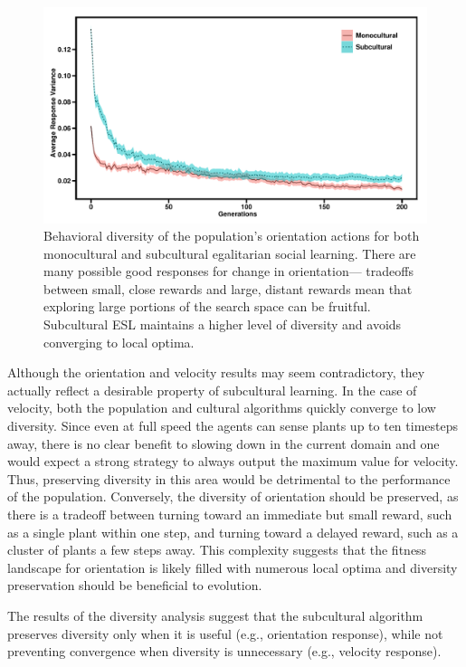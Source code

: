 \documentclass{sig-alternate}
\begin{document}
\begin{figure}
  \centering
    \includegraphics[scale=.42]{orientation_diversity.pdf}
  \caption{Behavioral diversity of the population's orientation actions for both monocultural and subcultural egalitarian social learning.   There are many possible good responses for change in orientation--- tradeoffs between small, close rewards and large, distant rewards mean that exploring large portions of the search space can be fruitful.  Subcultural ESL maintains a higher level of diversity and avoids converging to local optima.}
\label{fig:orientation}
\end{figure}

Although the orientation and velocity results may seem contradictory, they actually reflect a desirable property of subcultural learning. In the case of velocity, both the population and cultural algorithms quickly converge to low diversity. Since even at full speed the agents can sense plants up to ten timesteps away, there is no clear benefit to slowing down in the current domain and one would expect a strong strategy to always output the maximum value for velocity. Thus, preserving diversity in this area would be detrimental to the performance of the population. Conversely, the diversity of orientation should be preserved, as there is a tradeoff between turning toward an immediate but small reward, such as a single plant within one step, and turning toward a delayed reward, such as a cluster of plants a few steps away. This complexity suggests that the fitness landscape for orientation  is likely filled with numerous local optima and diversity preservation should be beneficial to evolution. 

The results of the diversity analysis suggest that the subcultural algorithm preserves diversity only when it is useful (e.g., orientation response), while not preventing convergence when diversity is unnecessary (e.g., velocity response).
\end{document}
